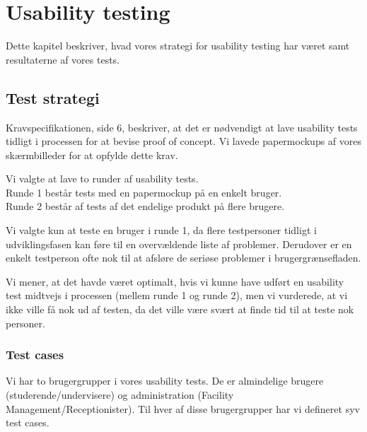 \chapter{Usability testing}
Dette kapitel beskriver, hvad vores strategi for usability testing har været samt resultaterne af vores tests.

\section{Test strategi}
Kravspecifikationen, side 6, beskriver, at det er nødvendigt at lave usability tests tidligt i processen for at bevise proof of concept. Vi lavede papermockups af vores skærmbilleder for at opfylde dette krav. 

Vi valgte at lave to runder af usability tests.
\\Runde 1 består tests med en papermockup på en enkelt bruger.
\\Runde 2 består af tests af det endelige produkt på flere brugere.

Vi valgte kun at teste en bruger i runde 1, da flere testpersoner tidligt i udviklingsfasen kan føre til en overvældende liste af problemer\cite[s. 416]{SL_UID}. Derudover er en enkelt testperson ofte nok til at afsløre de seriøse problemer i brugergrænsefladen.

Vi mener, at det havde været optimalt, hvis vi kunne have udført en usability test midtvejs i processen (mellem runde 1 og runde 2), men vi vurderede, at vi ikke ville få nok ud af testen, da det ville være svært at finde tid til at teste nok personer.

\subsection{Test cases}
Vi har to brugergrupper i vores usability tests. De er almindelige brugere (studerende/undervisere) og administration (Facility Management/Receptionister). Til hver af disse brugergrupper har vi defineret syv test cases.

